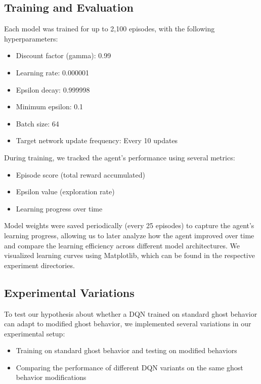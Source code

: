 \documentclass{article} %
\begin{document}
\subsection{Training and Evaluation}

Each model was trained for up to 2,100 episodes, with the following hyperparameters:
\begin{itemize}
  \item Discount factor (gamma): 0.99
  \item Learning rate: 0.000001
  \item Epsilon decay: 0.999998
  \item Minimum epsilon: 0.1
  \item Batch size: 64
  \item Target network update frequency: Every 10 updates
\end{itemize}

During training, we tracked the agent's performance using several metrics:
\begin{itemize}
  \item Episode score (total reward accumulated)
  \item Epsilon value (exploration rate)
  \item Learning progress over time
\end{itemize}

Model weights were saved periodically (every 25 episodes) to capture the agent's learning progress, allowing us to later analyze how the agent improved over time and compare the learning efficiency across different model architectures. We visualized learning curves using Matplotlib, which can be found in the respective experiment directories.

\subsection{Experimental Variations}

To test our hypothesis about whether a DQN trained on standard ghost behavior can adapt to modified ghost behavior, we implemented several variations in our experimental setup:
\begin{itemize}
  \item Training on standard ghost behavior and testing on modified behaviors
  \item Comparing the performance of different DQN variants on the same ghost behavior modifications
\end{itemize}
\end{document}
